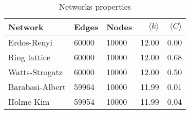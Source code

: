 \begin{table}[h!]
\centering
\caption{Networks properties}
\label{tab:networks}
\begin{tabular}{lllrr}
\toprule
         Network &  Edges &  Nodes & $\langle k \rangle$ & $\langle C \rangle$ \\  %
\midrule
     Erdos-Renyi &  60000 &  10000 & 12.00 &  0.00 \\
    Ring lattice &  60000 &  10000 & 12.00 &  0.68 \\
  Watts-Strogatz &  60000 &  10000 & 12.00 &  0.50 \\
 Barabasi-Albert &  59964 &  10000 & 11.99 &  0.01 \\
       Holme-Kim &  59954 &  10000 & 11.99 &  0.04 \\
\bottomrule
\end{tabular}
\end{table}
